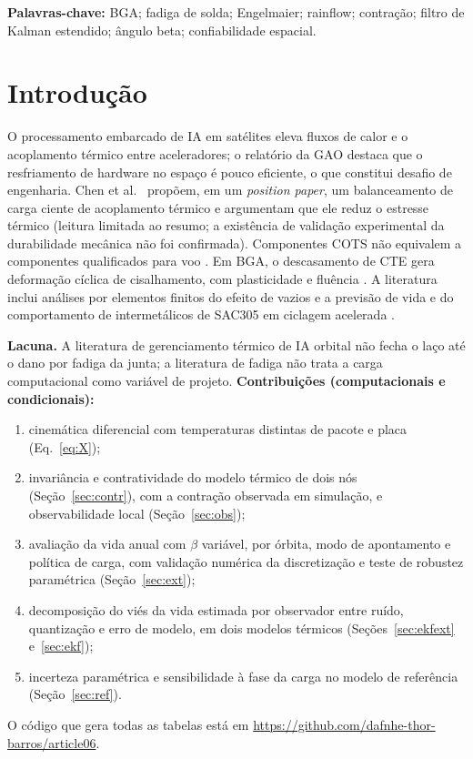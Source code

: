 \documentclass[12pt,a4paper]{article}
\newcommand{\repo}{\url{https://github.com/dafnhe-thor-barros/article06}}
\begin{document}
\noindent\textbf{Palavras-chave:} BGA; fadiga de solda; Engelmaier; rainflow;
contração; filtro de Kalman estendido; ângulo beta; confiabilidade espacial.

\section{Introdução}
O processamento embarcado de IA em satélites \cite{nasa2025,gao2026} eleva
fluxos de calor e o acoplamento térmico entre aceleradores; o relatório da
GAO \cite{gao2026} destaca que o resfriamento de hardware no espaço é pouco
eficiente, o que constitui desafio de engenharia. Chen et al.~\cite{chen2026}
propõem, em um \emph{position paper}, um balanceamento de carga ciente de
acoplamento térmico e argumentam que ele reduz o estresse térmico (leitura
limitada ao resumo; a existência de validação experimental da durabilidade
mecânica não foi confirmada). Componentes COTS não equivalem a componentes
qualificados para voo \cite{ecss6013,ecss6015}. Em BGA, o descasamento de CTE
gera deformação cíclica de cisalhamento, com plasticidade e fluência
\cite{ross1991,engelmaier1983}. A literatura inclui análises por elementos
finitos do efeito de vazios \cite{hu2023} e a previsão de vida e do
comportamento de intermetálicos de SAC305 em ciclagem acelerada
\cite{apalowo2024}.

\textbf{Lacuna.} A literatura de gerenciamento térmico de IA orbital não
fecha o laço até o dano por fadiga da junta; a literatura de fadiga não trata a
carga computacional como variável de projeto. \textbf{Contribuições
(computacionais e condicionais):}
\begin{enumerate}
\item cinemática diferencial com temperaturas distintas de pacote e placa
(Eq.~\ref{eq:X});
\item invariância e contratividade do modelo térmico de dois nós
(Seção~\ref{sec:contr}), com a contração observada em simulação, e
observabilidade local (Seção~\ref{sec:obs});
\item avaliação da vida anual com $\beta$ variável, por órbita, modo de
apontamento e política de carga, com validação numérica da discretização e
teste de robustez paramétrica (Seção~\ref{sec:ext});
\item decomposição do viés da vida estimada por observador entre ruído,
quantização e erro de modelo, em dois modelos térmicos
(Seções~\ref{sec:ekfext} e~\ref{sec:ekf});
\item incerteza paramétrica e sensibilidade à fase da carga no modelo de
referência (Seção~\ref{sec:ref}).
\end{enumerate}
O código que gera todas as tabelas está em \repo{}.
\end{document}
